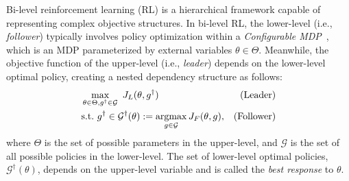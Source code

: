\documentclass[letterpaper]{article} %
\providecommand{\argmax}{\operatornamewithlimits{argmax}} %
\begin{document}
Bi-level reinforcement learning (RL) is a hierarchical framework capable of representing complex objective structures.
In bi-level RL, the lower-level (i.e., \emph{follower}) typically involves policy optimization within a \emph{Configurable MDP}~\citep{metelli18a}, which is an MDP parameterized by external variables $\theta \in \Theta$.
Meanwhile, the objective function of the upper-level (i.e., \emph{leader}) depends on the lower-level optimal policy, creating a nested dependency structure as follows:
\begin{align*}
    &\max_{\theta \in \Theta, g^{\dagger} \in \mathcal{G}}\ J_L(\theta, g^{\dagger})&\text{(Leader)}\\
    &\mathrm{s.t.}\ g^{\dagger} \in \mathcal{G}^\dag(\theta) := \argmax_{g \in \mathcal{G}} J_F(\theta, g),&\text{(Follower)}
\end{align*}
where $\Theta$ is the set of possible parameters in the upper-level, and $\mathcal{G}$ is the set of all possible policies in the lower-level.
The set of lower-level optimal policies, $\mathcal{G}^\dag(\theta)$, depends on the upper-level variable and is called the \emph{best response} to $\theta$.

\end{document}
